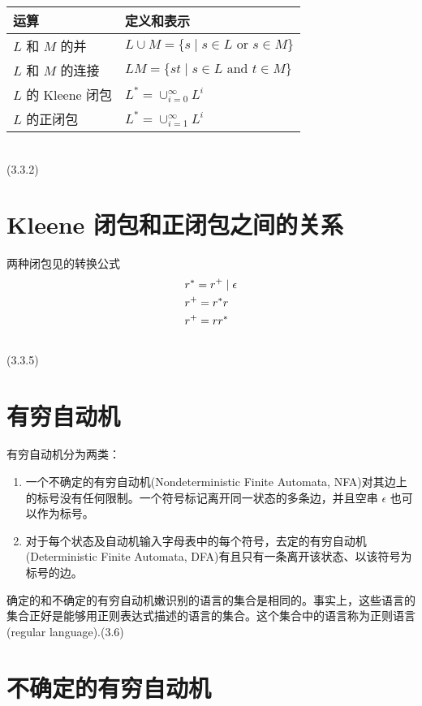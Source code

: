 \documentclass[12pt]{article}
\begin{document}
\begin{tabular}{ll}
\toprule
运算 & 定义和表示 \\
\midrule
$L$ 和 $M$ 的并     &   $L\cup M = \{ s \mid  s \in L \text{ or } s \in M\}$ \\
$L$ 和 $M$ 的连接 &   $LM = \{ st \mid  s \in L \text{ and } t \in M \}$ \\
$L$ 的 Kleene 闭包 &   $L^{*} = \cup_{i=0}^{\infty} L^{i}$ \\
$L$ 的正闭包          &   $L^{*} = \cup_{i=1}^{\infty} L^{i}$ \\
\bottomrule
\end{tabular} \\
(3.3.2)


\section*{Kleene 闭包和正闭包之间的关系}

两种闭包见的转换公式
\begin{align}
& r^{*} = r^{+} \mid \epsilon \notag \\
& r^{+} = r^{*}r \notag \\
& r^{+}= rr^{*} \notag
\end{align}
\\
(3.3.5)


\section*{有穷自动机}

有穷自动机分为两类：
\begin{enumerate}
\item 一个不确定的有穷自动机(Nondeterministic Finite Automata, NFA)对其边上的标号没有任何限制。一个符号标记离开同一状态的多条边，并且空串 $\epsilon$ 也可以作为标号。
\item 对于每个状态及自动机输入字母表中的每个符号，去定的有穷自动机(Deterministic Finite Automata, DFA)有且只有一条离开该状态、以该符号为标号的边。
\end{enumerate}

确定的和不确定的有穷自动机嫩识别的语言的集合是相同的。事实上，这些语言的集合正好是能够用正则表达式描述的语言的集合。这个集合中的语言称为正则语言(regular language).(3.6)

\section*{不确定的有穷自动机}
\end{document}
